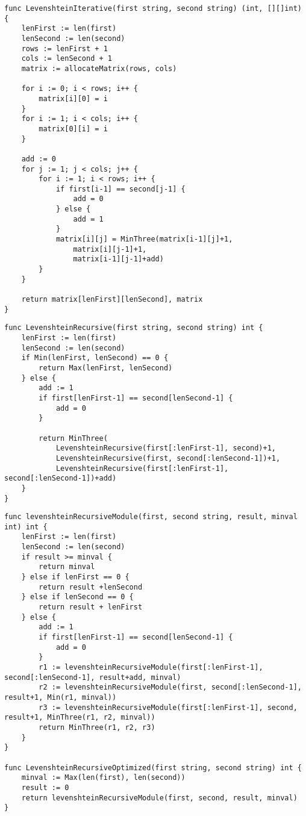 \begin{lstlisting}[caption={Матричная реализация алгоритма Левенштейна}]
func LevenshteinIterative(first string, second string) (int, [][]int) {
	lenFirst := len(first)
	lenSecond := len(second)
	rows := lenFirst + 1
	cols := lenSecond + 1
	matrix := allocateMatrix(rows, cols)

	for i := 0; i < rows; i++ {
		matrix[i][0] = i
	}
	for i := 1; i < cols; i++ {
		matrix[0][i] = i
	}

	add := 0
	for j := 1; j < cols; j++ {
		for i := 1; i < rows; i++ {
			if first[i-1] == second[j-1] {
				add = 0
			} else {
				add = 1
			}
			matrix[i][j] = MinThree(matrix[i-1][j]+1,
				matrix[i][j-1]+1,
				matrix[i-1][j-1]+add)
		}
	}

	return matrix[lenFirst][lenSecond], matrix
}
\end{lstlisting}

\begin{lstlisting}[caption={Рекурсивная версия алгоритма Левенштейна}]
func LevenshteinRecursive(first string, second string) int {
    lenFirst := len(first)
    lenSecond := len(second)
    if Min(lenFirst, lenSecond) == 0 {
        return Max(lenFirst, lenSecond)
    } else {
        add := 1
        if first[lenFirst-1] == second[lenSecond-1] {
            add = 0
        }

        return MinThree(
            LevenshteinRecursive(first[:lenFirst-1], second)+1,
            LevenshteinRecursive(first, second[:lenSecond-1])+1,
            LevenshteinRecursive(first[:lenFirst-1], second[:lenSecond-1])+add)
    }
}
\end{lstlisting}

\begin{lstlisting}[caption={Оптимизированная версия рекурсивного алгоритма Левенштейна}]
func levenshteinRecursiveModule(first, second string, result, minval int) int {
	lenFirst := len(first)
	lenSecond := len(second)
	if result >= minval {
		return minval
	} else if lenFirst == 0 {
		return result +lenSecond
	} else if lenSecond == 0 {
		return result + lenFirst
	} else {
		add := 1
		if first[lenFirst-1] == second[lenSecond-1] {
			add = 0
		}
		r1 := levenshteinRecursiveModule(first[:lenFirst-1], second[:lenSecond-1], result+add, minval)
		r2 := levenshteinRecursiveModule(first, second[:lenSecond-1], result+1, Min(r1, minval))
		r3 := levenshteinRecursiveModule(first[:lenFirst-1], second, result+1, MinThree(r1, r2, minval))
		return MinThree(r1, r2, r3)
	}
}

func LevenshteinRecursiveOptimized(first string, second string) int {
	minval := Max(len(first), len(second))
	result := 0
	return levenshteinRecursiveModule(first, second, result, minval)
}
\end{lstlisting}


